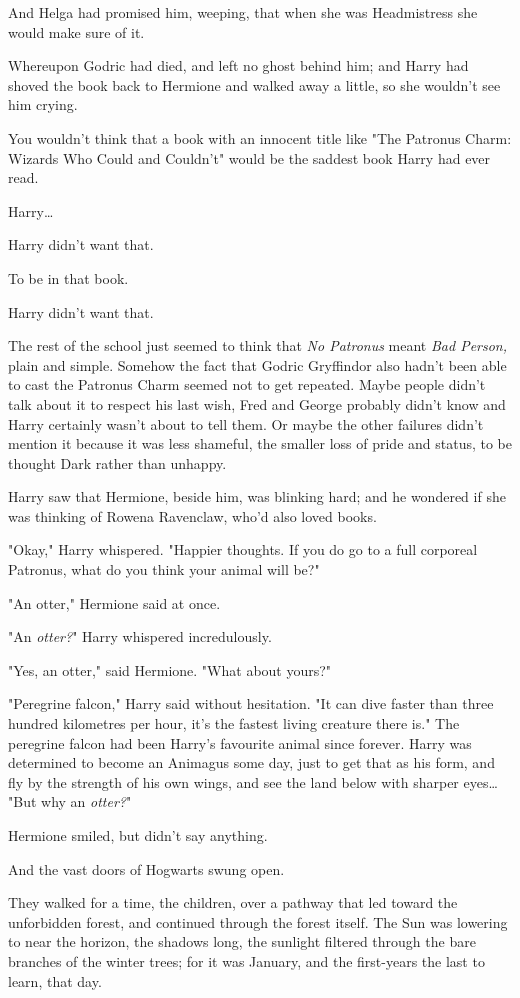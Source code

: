 And Helga had promised him, weeping, that when she was Headmistress she would
make sure of it.

Whereupon Godric had died, and left no ghost behind him; and Harry had shoved
the book back to Hermione and walked away a little, so she wouldn't see him
crying.

You wouldn't think that a book with an innocent title like "The Patronus Charm:
Wizards Who Could and Couldn't" would be the saddest book Harry had ever read.

Harry{\ldots}

Harry didn't want that.

To be in that book.

Harry didn't want that.

The rest of the school just seemed to think that \emph{No Patronus} meant
\emph{Bad Person,} plain and simple. Somehow the fact that Godric Gryffindor
also hadn't been able to cast the Patronus Charm seemed not to get repeated.
Maybe people didn't talk about it to respect his last wish, Fred and George
probably didn't know and Harry certainly wasn't about to tell them. Or maybe
the other failures didn't mention it because it was less shameful, the smaller
loss of pride and status, to be thought Dark rather than unhappy.

Harry saw that Hermione, beside him, was blinking hard; and he wondered if she
was thinking of Rowena Ravenclaw, who'd also loved books.

"Okay," Harry whispered. "Happier thoughts. If you do go to a full corporeal
Patronus, what do you think your animal will be?"

"An otter," Hermione said at once.

"An \emph{otter?}" Harry whispered incredulously.

"Yes, an otter," said Hermione. "What about yours?"

"Peregrine falcon," Harry said without hesitation. "It can dive faster than
three hundred kilometres per hour, it's the fastest living creature there is."
The peregrine falcon had been Harry's favourite animal since forever. Harry was
determined to become an Animagus some day, just to get that as his form, and fly
by the strength of his own wings, and see the land below with sharper
eyes{\ldots} "But why an \emph{otter?}"

Hermione smiled, but didn't say anything.

And the vast doors of Hogwarts swung open.

They walked for a time, the children, over a pathway that led toward the
unforbidden forest, and continued through the forest itself. The Sun was
lowering to near the horizon, the shadows long, the sunlight filtered through
the bare branches of the winter trees; for it was January, and the first-years
the last to learn, that day.

